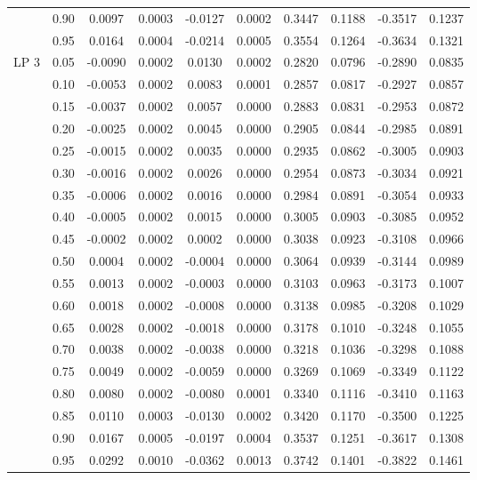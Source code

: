 \begin{table}[H]
\begin{tabular}{cccccccccc}
   & 0.90 & 0.0097 & 0.0003 & -0.0127 & 0.0002 & 0.3447 & 0.1188 & -0.3517 & 0.1237 \\ 
   & 0.95 & 0.0164 & 0.0004 & -0.0214 & 0.0005 & 0.3554 & 0.1264 & -0.3634 & 0.1321 \\ 
  LP 3 & 0.05 & -0.0090 & 0.0002 & 0.0130 & 0.0002 & 0.2820 & 0.0796 & -0.2890 & 0.0835 \\ 
   & 0.10 & -0.0053 & 0.0002 & 0.0083 & 0.0001 & 0.2857 & 0.0817 & -0.2927 & 0.0857 \\ 
   & 0.15 & -0.0037 & 0.0002 & 0.0057 & 0.0000 & 0.2883 & 0.0831 & -0.2953 & 0.0872 \\ 
   & 0.20 & -0.0025 & 0.0002 & 0.0045 & 0.0000 & 0.2905 & 0.0844 & -0.2985 & 0.0891 \\ 
   & 0.25 & -0.0015 & 0.0002 & 0.0035 & 0.0000 & 0.2935 & 0.0862 & -0.3005 & 0.0903 \\ 
   & 0.30 & -0.0016 & 0.0002 & 0.0026 & 0.0000 & 0.2954 & 0.0873 & -0.3034 & 0.0921 \\ 
   & 0.35 & -0.0006 & 0.0002 & 0.0016 & 0.0000 & 0.2984 & 0.0891 & -0.3054 & 0.0933 \\ 
   & 0.40 & -0.0005 & 0.0002 & 0.0015 & 0.0000 & 0.3005 & 0.0903 & -0.3085 & 0.0952 \\ 
   & 0.45 & -0.0002 & 0.0002 & 0.0002 & 0.0000 & 0.3038 & 0.0923 & -0.3108 & 0.0966 \\ 
   & 0.50 & 0.0004 & 0.0002 & -0.0004 & 0.0000 & 0.3064 & 0.0939 & -0.3144 & 0.0989 \\ 
   & 0.55 & 0.0013 & 0.0002 & -0.0003 & 0.0000 & 0.3103 & 0.0963 & -0.3173 & 0.1007 \\ 
   & 0.60 & 0.0018 & 0.0002 & -0.0008 & 0.0000 & 0.3138 & 0.0985 & -0.3208 & 0.1029 \\ 
   & 0.65 & 0.0028 & 0.0002 & -0.0018 & 0.0000 & 0.3178 & 0.1010 & -0.3248 & 0.1055 \\ 
   & 0.70 & 0.0038 & 0.0002 & -0.0038 & 0.0000 & 0.3218 & 0.1036 & -0.3298 & 0.1088 \\ 
   & 0.75 & 0.0049 & 0.0002 & -0.0059 & 0.0000 & 0.3269 & 0.1069 & -0.3349 & 0.1122 \\ 
   & 0.80 & 0.0080 & 0.0002 & -0.0080 & 0.0001 & 0.3340 & 0.1116 & -0.3410 & 0.1163 \\ 
   & 0.85 & 0.0110 & 0.0003 & -0.0130 & 0.0002 & 0.3420 & 0.1170 & -0.3500 & 0.1225 \\ 
   & 0.90 & 0.0167 & 0.0005 & -0.0197 & 0.0004 & 0.3537 & 0.1251 & -0.3617 & 0.1308 \\ 
   & 0.95 & 0.0292 & 0.0010 & -0.0362 & 0.0013 & 0.3742 & 0.1401 & -0.3822 & 0.1461 \\ 

\end{tabular}
\end{table}
